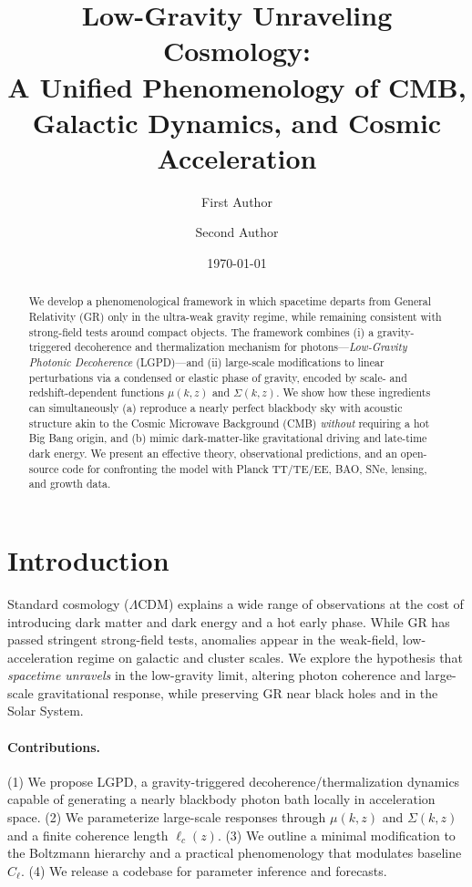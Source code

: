 \documentclass[11pt]{article}
\title{Low-Gravity Unraveling Cosmology:\\
A Unified Phenomenology of CMB, Galactic Dynamics, and Cosmic Acceleration}
\author[1]{First Author}
\author[1]{Second Author}
\affil[1]{Institute for Speculative Cosmology, Anywhere University}
\date{\today}
\begin{document}
\maketitle

\begin{abstract}
We develop a phenomenological framework in which spacetime departs from General Relativity (GR) only in the ultra-weak gravity regime, while remaining consistent with strong-field tests around compact objects.
The framework combines (i) a gravity-triggered decoherence and thermalization mechanism for photons---\emph{Low-Gravity Photonic Decoherence} (LGPD)---and (ii) large-scale modifications to linear perturbations via a condensed or elastic phase of gravity, encoded by scale- and redshift-dependent functions $\mu(k,z)$ and $\Sigma(k,z)$.
We show how these ingredients can simultaneously (a) reproduce a nearly perfect blackbody sky with acoustic structure akin to the Cosmic Microwave Background (CMB) \emph{without} requiring a hot Big Bang origin, and (b) mimic dark-matter-like gravitational driving and late-time dark energy.
We present an effective theory, observational predictions, and an open-source code for confronting the model with Planck TT/TE/EE, BAO, SNe, lensing, and growth data.
\end{abstract}

\section{Introduction}
Standard cosmology ($\Lambda$CDM) explains a wide range of observations at the cost of introducing dark matter and dark energy and a hot early phase.
While GR has passed stringent strong-field tests, anomalies appear in the weak-field, low-acceleration regime on galactic and cluster scales.
We explore the hypothesis that \emph{spacetime unravels} in the low-gravity limit, altering photon coherence and large-scale gravitational response, while preserving GR near black holes and in the Solar System.

\paragraph{Contributions.} (1) We propose LGPD, a gravity-triggered decoherence/thermalization dynamics capable of generating a nearly blackbody photon bath locally in acceleration space. (2) We parameterize large-scale responses through $\mu(k,z)$ and $\Sigma(k,z)$ and a finite coherence length $\ell_c(z)$. (3) We outline a minimal modification to the Boltzmann hierarchy and a practical phenomenology that modulates baseline $C_\ell$. (4) We release a codebase for parameter inference and forecasts.
\end{document}
